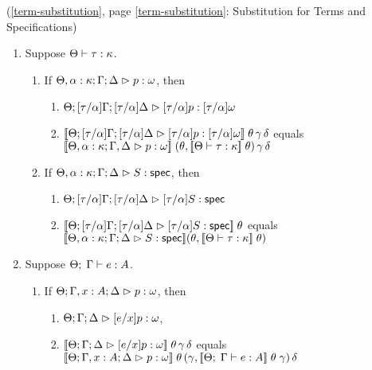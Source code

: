 \begin{lemma*}{(\ref{term-substitution}, page \ref{term-substitution}: Substitution for Terms and Specifications)}
\begin{enumerate}
\item Suppose $\judgeWK{\tau}{\kappa}$.
  \begin{enumerate}
  \item If $\judgeA[\Theta, \alpha:\kappa; \Gamma; \Delta]{p}{\omega}$, 
        then 
        \begin{enumerate}
        \item $\judgeA[\Theta; {[\tau/\alpha]}\Gamma; {[\tau/\alpha]}\Delta]{{[\tau/\alpha]}p}{{[\tau/\alpha]}\omega}$
        \item $\interp{\judgeA[\Theta; {[\tau/\alpha]}\Gamma; {[\tau/\alpha]}\Delta]{{[\tau/\alpha]}p}{{[\tau/\alpha]}\omega}}\;\theta\,\gamma\,\delta$ equals \\
          $\interp{\judgeA[\Theta, \alpha:\kappa; \Gamma, \Delta]{p}{\omega}}\;(\theta,\interp{\judgeWK{\tau}{\kappa}}\;\theta)\,\gamma\,\delta$
        \end{enumerate}
  \item If $\judgeS[\Theta, \alpha:\kappa; \Gamma; \Delta]{S}$, 
        then 
        \begin{enumerate}
        \item $\judgeS[\Theta; {[\tau/\alpha]}\Gamma; {[\tau/\alpha]}\Delta]{{[\tau/\alpha]}S}$
        \item $\interp{\judgeS[\Theta; {[\tau/\alpha]}\Gamma; {[\tau/\alpha]}\Delta]{{[\tau/\alpha]}S}}\;\theta$ equals \\
              $\interp{\judgeS[\Theta, \alpha:\kappa; \Gamma; \Delta]{S}}(\theta, \interp{\judgeWK{\tau}{\kappa}}\;\theta)$
        \end{enumerate}
  \end{enumerate}
\item Suppose $\judgeE{\Gamma}{e}{A}$.
  \begin{enumerate}
  \item If $\judgeA[\Theta; \Gamma, x:A; \Delta]{p}{\omega}$, 
        then 
        \begin{enumerate}
        \item $\judgeA[\Theta; \Gamma; \Delta]{[e/x]p}{\omega}$, 
        \item $\interp{\judgeA[\Theta; \Gamma; \Delta]{[e/x]p}{\omega}}\;\theta\,\gamma\,\delta$ equals \\
              $\interp{\judgeA[\Theta; \Gamma, x:A; \Delta]{p}{\omega}}\;\theta\,(\gamma, \interp{\judgeE{\Gamma}{e}{A}}\;\theta\;\gamma)\,\delta$               

\end{enumerate}
\end{enumerate}
\end{enumerate}
\end{lemma*}
